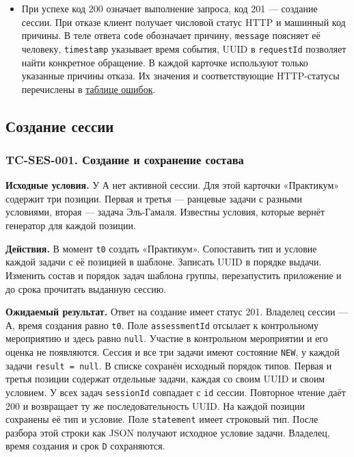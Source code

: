 \documentclass[12pt,a4paper]{article}
\begin{document}
\begin{itemize}
\item
  При успехе код 200 означает выполнение запроса, код 201 --- создание сессии. При отказе клиент получает числовой статус HTTP и машинный код причины. В теле ответа \texttt{code} обозначает причину, \texttt{message} поясняет её человеку, \texttt{timestamp} указывает время события, UUID в \texttt{requestId} позволяет найти конкретное обращение. В каждой карточке используют только указанные причины отказа. Их значения и соответствующие HTTP-статусы перечислены в {\href{../07\_Программные\_требования/DOC-06.2\_Сессии\_задач\_и\_планировщик.pdf\#коды-и-представление-ошибок}{таблице ошибок}}.
\end{itemize}

\subsection{Создание сессии}\label{ux441ux43eux437ux434ux430ux43dux438ux435-ux441ux435ux441ux441ux438ux438}

\hypertarget{создание-сессии}{}

\subsubsection{TC-SES-001. Создание и сохранение состава}\label{tc-ses-001-ux441ux43eux437ux434ux430ux43dux438ux435-ux438-ux441ux43eux445ux440ux430ux43dux435ux43dux438ux435-ux441ux43eux441ux442ux430ux432ux430}

\hypertarget{tc-ses-001-создание-и-сохранение-состава}{}

\hypertarget{tc-ses-001}{}

\textbf{Исходные условия.} У А нет активной сессии. Для этой карточки «Практикум» содержит три позиции. Первая и третья --- ранцевые задачи с разными условиями, вторая --- задача Эль-Гамаля. Известны условия, которые вернёт генератор для каждой позиции.

\textbf{Действия.} В момент \texttt{t0} создать «Практикум». Сопоставить тип и условие каждой задачи с её позицией в шаблоне. Записать UUID в порядке выдачи. Изменить состав и порядок задач шаблона группы, перезапустить приложение и до срока прочитать выданную сессию.

\textbf{Ожидаемый результат.} Ответ на создание имеет статус 201. Владелец сессии --- А, время создания равно \texttt{t0}. Поле \texttt{assessment\allowbreak{}Id} отсылает к контрольному мероприятию и здесь равно \texttt{null}. Участие в контрольном мероприятии и его оценка не появляются. Сессия и все три задачи имеют состояние \texttt{NEW}, у каждой задачи \texttt{result\ =\ null}. В списке сохранён исходный порядок типов. Первая и третья позиции содержат отдельные задачи, каждая со своим UUID и своим условием. У всех задач \texttt{sessionId} совпадает с \texttt{id} сессии. Повторное чтение даёт 200 и возвращает ту же последовательность UUID. На каждой позиции сохранены её тип и условие. Поле \texttt{statement} имеет строковый тип. После разбора этой строки как JSON получают исходное условие задачи. Владелец, время создания и срок \texttt{D} сохраняются.
\end{document}

